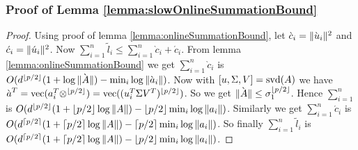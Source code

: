 \subsubsection{Proof of Lemma \ref{lemma:slowOnlineSummationBound}}
\begin{proof}{\label{proof:slowOnlineSummationBound}}
 Using proof of lemma \ref{lemma:onlineSummationBound}, let $\grave{c}_{i} = \|\grave{\*u}_{i}\|^{2}$ and $\acute{c}_{i} = \|\acute{\*u}_{i}\|^{2}$. Now $\sum_{i=1}^{n} \tilde{l}_{i}\leq\sum_{i=1}^{n}\grave{c}_{i} + \acute{c}_{i}$. From lemma \ref{lemma:onlineSummationBound} we get $\sum_{i=1}^{n} \grave{c}_{i}$ is $O(d^{\lfloor p/2 \rfloor}(1+\log \|\grave{\*A}\|)-\min_{i}\log \|\grave{\*a}_{i}\|)$. Now with $[\*u,\Sigma,\*V] = \mbox{svd}(\*A)$ we have $\grave{\*a}^{T} = \mbox{vec}(\*a_{i}^{T} \otimes^{\lfloor p/2 \rfloor}) = \mbox{vec}((\*u_{i}^{T}\Sigma\*V^{T})^{\lfloor p/2 \rfloor})$. So we get $\|\grave{\*A}\| \leq \sigma_{1}^{\lfloor p/2 \rfloor}$. Hence $\sum_{i=1}^{n}$ is $O(d^{\lfloor p/2 \rfloor}(1+\lfloor p/2 \rfloor\log \|\*A\|)-\lfloor p/2 \rfloor\min_{i}\log \|\*a_{i}\|)$. Similarly we get $\sum_{i=1}^{n} \acute{c}_{i}$ is $O(d^{\lceil p/2 \rceil}(1+\lceil p/2 \rceil\log \|\*A\|)-\lceil p/2 \rceil\min_{i}\log \|\*a_{i}\|)$. So finally $\sum_{i=1}^{n} \tilde{l}_{i}$ is $O(d^{\lceil p/2 \rceil}(1+\lceil p/2 \rceil\log \|\*A\|)-\lfloor p/2 \rfloor\min_{i}\log \|\*a_{i}\|)$.
\end{proof}
% 
